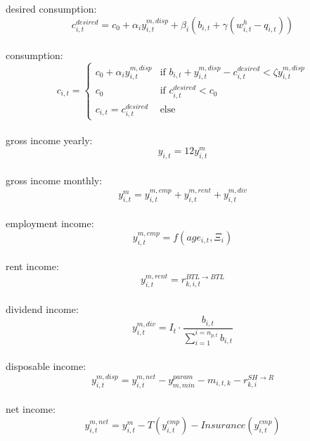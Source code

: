 \documentclass[]{article}
\begin{document}
desired consumption:
\begin{equation} \label{eq:d_consumption}
c^{desired}_{i,t} = c_{0} + \alpha_{i} y^{m,disp}_{i,t} + \beta_{i}\left(b_{i,t} + \gamma (w^{h}_{i,t} -  q_{i,t})\right)
\end{equation}
\\
consumption:
\begin{equation} \label{eq:consumption}
	c_{i,t} = 
		\begin{cases}
		c_{0} + \alpha_{i} y^{m,disp}_{i,t} & \text{if } b_{i,t} + y^{m,disp}_{i,t} - c^{desired}_{i,t} <\zeta y^{m,disp}_{i,t}\\
		c_{0} & \text{if } c^{desired}_{i,t} < c_{0} \\
		c_{i,t}=c^{desired}_{i,t} & \text{else }
		\end{cases}
\end{equation}
\\
gross income yearly:
\begin{equation} \label{eq:income_y}
y_{i,t}=  12y^{m}_{i,t}
\end{equation}
\\
gross income monthly:
\begin{equation} \label{eq:income_m}
y^{m}_{i,t}= y^{m, emp}_{i,t} + y^{m,rent}_{i,t} +y^{m,div}_{i,t}
\end{equation}
\\
employment income:
\begin{equation} \label{eq:emp_income}
	y^{m, emp}_{i,t} = f(age_{i, t}, \Xi_{i})
\end{equation}
\\
rent income:
\begin{equation} \label{eq:rent_income}
y^{m, rent}_{i,t} = r^{BTL\rightarrow BTL}_{k, i, t}
\end{equation}
\\
dividend income:
\begin{equation} \label{eq:div_income}
y^{m,div}_{i,t} = I_{t} \cdot \frac{b_{i,t}}{\sum_{i=1}^{i=n_{p,t}} b_{i,t}}
\end{equation}
\\
disposable income:
\begin{equation} \label{eq:disp_income}
y^{m,disp}_{i,t}= y^{m,net}_{i,t}- y^{param}_{m,min} - m_{i,t,k} - r^{SH\rightarrow R}_{k,i}
\end{equation}
\\
net income:
\begin{equation} \label{eq:net_income}
y^{m,net}_{i,t}=  y^{m}_{i,t} - T(y^{emp}_{i,t}) - Insurance(y^{emp}_{i,t})
\end{equation}
\end{document}
